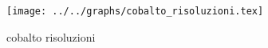 \begin{figure}[h] \centering\texttt{[image: ../../graphs/cobalto\_risoluzioni.tex]}\caption{cobalto risoluzioni}\label{gr:cobalto_risoluzioni} \end{figure}
